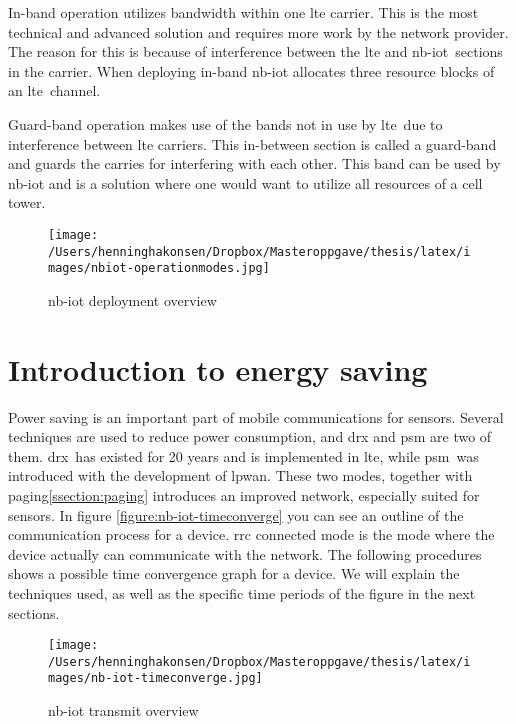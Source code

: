 \documentclass[USenglish]{ifimaster}  %
\begin{document}
In-band operation utilizes bandwidth within one \acrshort{lte} carrier. This is the most technical and advanced solution and requires more work by the network provider. The reason for this is because of interference between the \acrshort{lte} and \acrshort{nb-iot} sections in the carrier. When deploying in-band \acrshort{nb-iot} allocates three resource blocks of an \acrshort{lte} channel.

Guard-band operation makes use of the bands not in use by \acrshort{lte} due to interference between \acrshort{lte} carriers. This in-between section is called a guard-band and guards the carries for interfering with each other. This band can be used by \acrshort{nb-iot} and is a solution where one would want to utilize all resources of a cell tower.

\begin{figure}[ht]
  \centering\texttt{[image: /Users/henninghakonsen/Dropbox/Masteroppgave/thesis/latex/images/nbiot-operationmodes.jpg]}
  \caption[\acrshort{nb-iot} deployment overview]{\acrshort{nb-iot} deployment overview \cite{online:legacyWire}}
  \label{figure:nbiot-operationmodes}
\end{figure}

\section{Introduction to energy saving} \label{section:energysaving}
Power saving is an important part of mobile communications for sensors. Several techniques are used to reduce power consumption, and \acrfull{drx} and \acrfull{psm} are two of them. \acrshort{drx} has existed for 20 years and is implemented in \acrshort{lte}, while \acrshort{psm} was introduced with the development of \acrshort{lpwan}. These two modes, together with paging\ref{ssection:paging} introduces an improved network, especially suited for sensors. In figure \vref{figure:nb-iot-timeconverge} you can see an outline of the communication process for a device. \acrfull{rrc} connected mode is the mode where the device actually can communicate with the network. The following procedures shows a possible time convergence graph for a device. We will explain the techniques used, as well as the specific time periods of the figure in the next sections.

\begin{figure}[ht]
  \centering\texttt{[image: /Users/henninghakonsen/Dropbox/Masteroppgave/thesis/latex/images/nb-iot-timeconverge.jpg]}
  \caption[\acrshort{nb-iot} transmit overview]{\acrshort{nb-iot} transmit overview \cite{person:ola}}
  \label{figure:nb-iot-timeconverge}
\end{figure}
\end{document}
